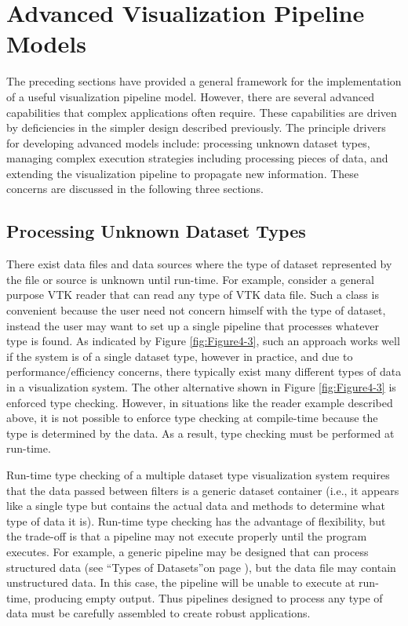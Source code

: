 \section{Advanced Visualization Pipeline Models}
\label{sec:advanced_visualization_pipeline_models}

The preceding sections have provided a general framework for the implementation of a useful visualization pipeline model. However, there are several advanced capabilities that complex applications often require. These capabilities are driven by deficiencies in the simpler design described previously. The principle drivers for developing advanced models include: processing unknown dataset types, managing complex execution strategies including processing pieces of data, and extending the visualization pipeline to propagate new information. These concerns are discussed in the following three sections.

\subsection{Processing Unknown Dataset Types}
\label{subsec:processing_unknown_dataset_types}

There exist data files and data sources where the type of dataset represented by the file or source is unknown until run-time. For example, consider a general purpose VTK reader that can read any type of VTK data file. Such a class is convenient because the user need not concern himself with the type of dataset, instead the user may want to set up a single pipeline that processes whatever type is found. As indicated by Figure \ref{fig:Figure4-3}, such an approach works well if the system is of a single dataset type, however in practice, and due to performance/efficiency concerns, there typically exist many different types of data in a visualization system. The other alternative shown in Figure \ref{fig:Figure4-3} is enforced type checking. However, in situations like the reader example described above, it is not possible to enforce type checking at compile-time because the type is determined by the data. As a result, type checking must be performed at run-time.

Run-time type checking of a multiple dataset type visualization system requires that the data passed between filters is a generic dataset container (i.e., it appears like a single type but contains the actual data and methods to determine what type of data it is). Run-time type checking has the advantage of flexibility, but the trade-off is that a pipeline may not execute properly until the program executes. For example, a generic pipeline may be designed that can process structured data (see ``Types of Datasets''on page \pageref{sec:types_of_datasets}), but the data file may contain unstructured data. In this case, the pipeline will be unable to execute at run-time, producing empty output. Thus pipelines designed to process any type of data must be carefully assembled to create robust applications.

